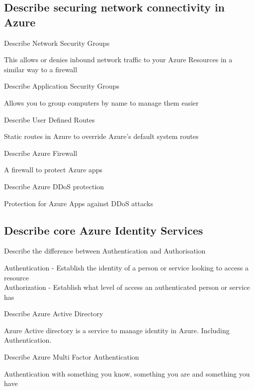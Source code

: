 \documentclass[addpoints]{exam}
\begin{document}
\begin{questions}
\subsection{Describe securing network connectivity in Azure}
\question Describe Network Security Groups
\begin{solution}[2in]
	This allows or denies inbound network traffic to your Azure Resources in a similar way to a firewall
\end{solution}
\question Describe Application Security Groups
\begin{solution}[2in]
	Allows you to group computers by name to manage them easier
\end{solution}
\question Describe User Defined Routes
\begin{solution}[2in]
	Static routes in Azure to override Azure's default system routes
\end{solution}
\question Describe Azure Firewall
\begin{solution}[2in]
	A firewall to protect Azure apps
\end{solution}
\question Describe Azure DDoS protection
\begin{solution}[2in]
	Protection for Azure Apps against DDoS attacks
\end{solution}
\subsection{Describe core Azure Identity Services}
\question Describe the difference between Authentication and Authorisation
\begin{solution}[2in]
	Authentication - Establish the identity of a person or service looking to access a resource\\
	Authorization - Establish what level of access an authenticated person or service has
\end{solution}
\question Describe Azure Active Directory
\begin{solution}[2in]
	Azure Active directory is a service to manage identity in Azure. Including Authentication.
\end{solution}
\question Describe Azure Multi Factor Authentication
\begin{solution}[2in]
	Authentication with something you know, something you are and something you have
\end{solution}

\end{questions}
\end{document}
